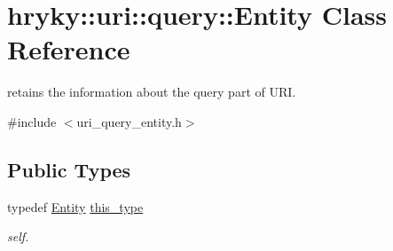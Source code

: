 \hypertarget{classhryky_1_1uri_1_1query_1_1_entity}{\section{hryky\-:\-:uri\-:\-:query\-:\-:Entity Class Reference}
\label{classhryky_1_1uri_1_1query_1_1_entity}
}


retains the information about the query part of U\-R\-I.  




{\ttfamily \#include $<$uri\-\_\-query\-\_\-entity.\-h$>$}

\subsection*{Public Types}
\begin{DoxyCompactItemize}
\item 
\hypertarget{classhryky_1_1uri_1_1query_1_1_entity_a169f59d5b5b0d125a9128047e916f802}{typedef \hyperlink{classhryky_1_1uri_1_1query_1_1_entity}{Entity} \hyperlink{classhryky_1_1uri_1_1query_1_1_entity_a169f59d5b5b0d125a9128047e916f802}{this\-\_\-type}}\label{classhryky_1_1uri_1_1query_1_1_entity_a169f59d5b5b0d125a9128047e916f802}

\begin{DoxyCompactList}\small\item\em self. \end{DoxyCompactList}\end{DoxyCompactItemize}
